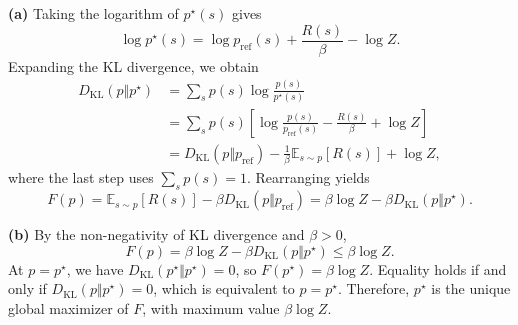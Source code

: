 \documentclass[11pt,a4paper]{article}
\newcommand{\E}{\mathbb{E}}
\newcommand{\KL}{D_{\mathrm{KL}}}
\newcommand{\pref}{p_{\mathrm{ref}}}
\begin{document}
\textbf{(a)}
Taking the logarithm of \(p^\star(s)\) gives
\[
\log p^\star(s)=\log\pref(s)+\frac{R(s)}{\beta}-\log Z.
\]
Expanding the KL divergence, we obtain
\[
\begin{aligned}
\KL(p\Vert p^\star)
&=\sum_s p(s)\log\frac{p(s)}{p^\star(s)}\\
&=\sum_s p(s)
  \left[\log\frac{p(s)}{\pref(s)}-\frac{R(s)}{\beta}+\log Z\right]\\
&=\KL(p\Vert\pref)
  -\frac{1}{\beta}\E_{s\sim p}[R(s)]+\log Z,
\end{aligned}
\]
where the last step uses \(\sum_s p(s)=1\). Rearranging yields
\[
F(p)=\E_{s\sim p}[R(s)]-\beta\KL(p\Vert\pref)
=\beta\log Z-\beta\KL(p\Vert p^\star).
\]

\textbf{(b)}
By the non-negativity of KL divergence and \(\beta>0\),
\[
F(p)=\beta\log Z-\beta\KL(p\Vert p^\star)\leq\beta\log Z.
\]
At \(p=p^\star\), we have \(\KL(p^\star\Vert p^\star)=0\), so
\(F(p^\star)=\beta\log Z\). Equality holds if and only if
\(\KL(p\Vert p^\star)=0\), which is equivalent to \(p=p^\star\).
Therefore, \(p^\star\) is the unique global maximizer of \(F\), with
maximum value \(\beta\log Z\).
\end{document}
